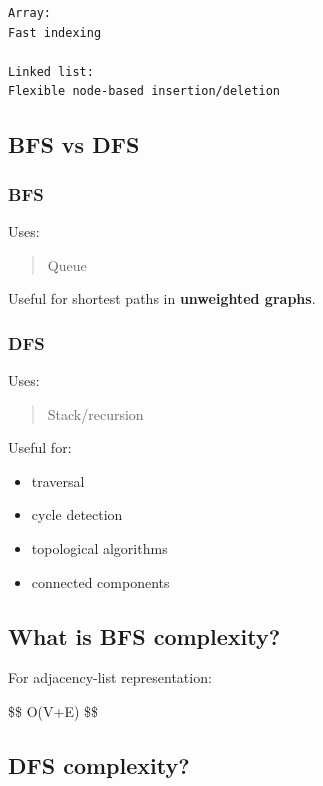 \begin{lstlisting}
Array:
Fast indexing

Linked list:
Flexible node-based insertion/deletion
\end{lstlisting}

\medskip

\subsection{BFS vs DFS}

\subsubsection{BFS}

Uses:

\begin{quote}
Queue\\
\end{quote}

Useful for shortest paths in \textbf{unweighted graphs}.

\subsubsection{DFS}

Uses:

\begin{quote}
Stack/recursion\\
\end{quote}

Useful for:

\begin{itemize}
  \item traversal
  \item cycle detection
  \item topological algorithms
  \item connected components
\end{itemize}

\medskip

\subsection{What is BFS complexity?}

For adjacency-list representation:

\$\$
O(V+E)
\$\$

\medskip

\subsection{DFS complexity?}

